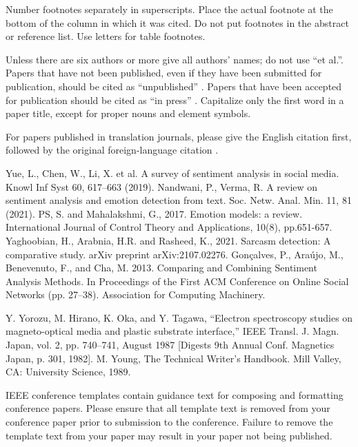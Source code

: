 \documentclass[conference]{IEEEtran}
\begin{document}
Number footnotes separately in superscripts. Place the actual footnote at 
the bottom of the column in which it was cited. Do not put footnotes in the 
abstract or reference list. Use letters for table footnotes.

Unless there are six authors or more give all authors' names; do not use 
``et al.''. Papers that have not been published, even if they have been 
submitted for publication, should be cited as ``unpublished'' \cite{b4}. Papers 
that have been accepted for publication should be cited as ``in press'' \cite{b5}. 
Capitalize only the first word in a paper title, except for proper nouns and 
element symbols.

For papers published in translation journals, please give the English 
citation first, followed by the original foreign-language citation \cite{b6}.

\begin{thebibliography}{00}
 Yue, L., Chen, W., Li, X. et al. A survey of sentiment analysis in social media. Knowl Inf Syst 60, 617–663 (2019).
 Nandwani, P., Verma, R. A review on sentiment analysis and emotion detection from text. Soc. Netw. Anal. Min. 11, 81 (2021).
 PS, S. and Mahalakshmi, G., 2017. Emotion models: a review. International Journal of Control Theory and Applications, 10(8), pp.651-657.
 Yaghoobian, H., Arabnia, H.R. and Rasheed, K., 2021. Sarcasm detection: A comparative study. arXiv preprint arXiv:2107.02276.
 Gonçalves, P., Araújo, M., Benevenuto, F., and Cha, M. 2013. Comparing and Combining Sentiment Analysis Methods. In Proceedings of the First ACM Conference on Online Social Networks (pp. 27–38). Association for Computing Machinery.

 Y. Yorozu, M. Hirano, K. Oka, and Y. Tagawa, ``Electron spectroscopy studies on magneto-optical media and plastic substrate interface,'' IEEE Transl. J. Magn. Japan, vol. 2, pp. 740--741, August 1987 [Digests 9th Annual Conf. Magnetics Japan, p. 301, 1982].
 M. Young, The Technical Writer's Handbook. Mill Valley, CA: University Science, 1989.
\end{thebibliography}
\vspace{12pt}
\color{red}
IEEE conference templates contain guidance text for composing and formatting conference papers. Please ensure that all template text is removed from your conference paper prior to submission to the conference. Failure to remove the template text from your paper may result in your paper not being published.
\end{document}
